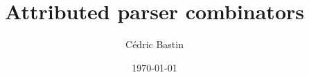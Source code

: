 \documentclass[a4paper]{article}
\title{Attributed parser combinators}
\author{Cédric Bastin}
\date{\today}
\begin{document}
\maketitle

\begin{abstract}

\end{abstract}



% 

%
%
%








\end{document}
